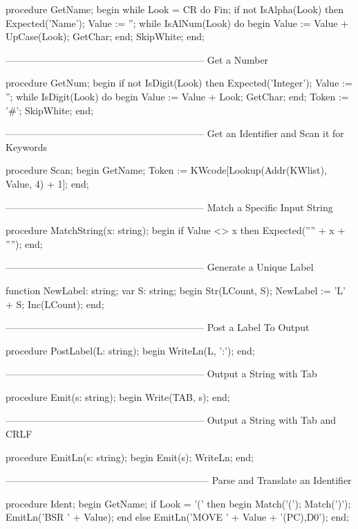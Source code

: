 \documentclass[float=false, crop=false]{standalone}
\begin{document}
\begin{code}
procedure GetName;
begin
   while Look = CR do
      Fin;
   if not IsAlpha(Look) then Expected('Name');
   Value := '';
   while IsAlNum(Look) do begin
     Value := Value + UpCase(Look);
     GetChar;
   end;
   SkipWhite;
end;


{--------------------------------------------------------------}
{ Get a Number }

procedure GetNum;
begin
   if not IsDigit(Look) then Expected('Integer');
   Value := '';
   while IsDigit(Look) do begin
     Value := Value + Look;
     GetChar;
   end;
   Token := '#';
   SkipWhite;
end;


{--------------------------------------------------------------}
{ Get an Identifier and Scan it for Keywords }

procedure Scan;
begin
   GetName;
   Token := KWcode[Lookup(Addr(KWlist), Value, 4) + 1];
end;


{--------------------------------------------------------------}
{ Match a Specific Input String }

procedure MatchString(x: string);
begin
   if Value <> x then Expected('''' + x + '''');
end;


{--------------------------------------------------------------}
{ Generate a Unique Label }

function NewLabel: string;
var S: string;
begin
   Str(LCount, S);
   NewLabel := 'L' + S;
   Inc(LCount);
end;


{--------------------------------------------------------------}
{ Post a Label To Output }

procedure PostLabel(L: string);
begin
   WriteLn(L, ':');
end;


{--------------------------------------------------------------}
{ Output a String with Tab }

procedure Emit(s: string);
begin
   Write(TAB, s);
end;


{--------------------------------------------------------------}
{ Output a String with Tab and CRLF }

procedure EmitLn(s: string);
begin
   Emit(s);
   WriteLn;
end;


{---------------------------------------------------------------}
{ Parse and Translate an Identifier }

procedure Ident;
begin
   GetName;
   if Look = '(' then begin
      Match('(');
      Match(')');
      EmitLn('BSR ' + Value);
      end
   else
      EmitLn('MOVE ' + Value + '(PC),D0');
end;



\end{code}
\end{document}
